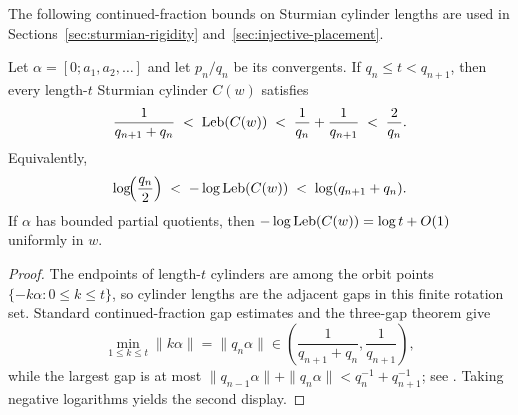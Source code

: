 The following continued-fraction bounds on Sturmian cylinder lengths are used
in Sections~\ref{sec:sturmian-rigidity}
and~\ref{sec:injective-placement}.

\begin{theorem}\label{thm:spg-sturmian-cylinder-measure-continued-fraction-sandwich}
Let $\alpha=[0;a_1,a_2,\dots]$ and let $p_n/q_n$ be its convergents.  If
$q_n\le t<q_{n+1}$, then every length-$t$ Sturmian cylinder $C(w)$ satisfies
\[
\frac{1}{q_{n+1}+q_n}
\;<\;
\mathrm{Leb}(C(w))
\;<\;
\frac{1}{q_n}+\frac{1}{q_{n+1}}
\;<\;
\frac{2}{q_n}.
\]
Equivalently,
\[
\log\!\Bigl(\frac{q_n}{2}\Bigr)
\;<\;
-\log\mathrm{Leb}(C(w))
\;<\;
\log(q_{n+1}+q_n).
\]
If $\alpha$ has bounded partial quotients, then
$-\log\mathrm{Leb}(C(w))=\log t+O(1)$ uniformly in $w$.
\end{theorem}

\begin{proof}
The endpoints of length-$t$ cylinders are among the orbit points
$\{-k\alpha:0\le k\le t\}$, so cylinder lengths are the adjacent gaps in this
finite rotation set.  Standard continued-fraction gap estimates and the
three-gap theorem give
\[
\min_{1\le k\le t}\|k\alpha\|
=
\|q_n\alpha\|
\in
\left(\frac{1}{q_{n+1}+q_n},\frac{1}{q_{n+1}}\right),
\]
while the largest gap is at most
$\|q_{n-1}\alpha\|+\|q_n\alpha\|<q_n^{-1}+q_{n+1}^{-1}$; see
\cite{Slater1950DistributionIntegers,Slater1967GapsSteps}.  Taking negative
logarithms yields the second display.
\end{proof}
